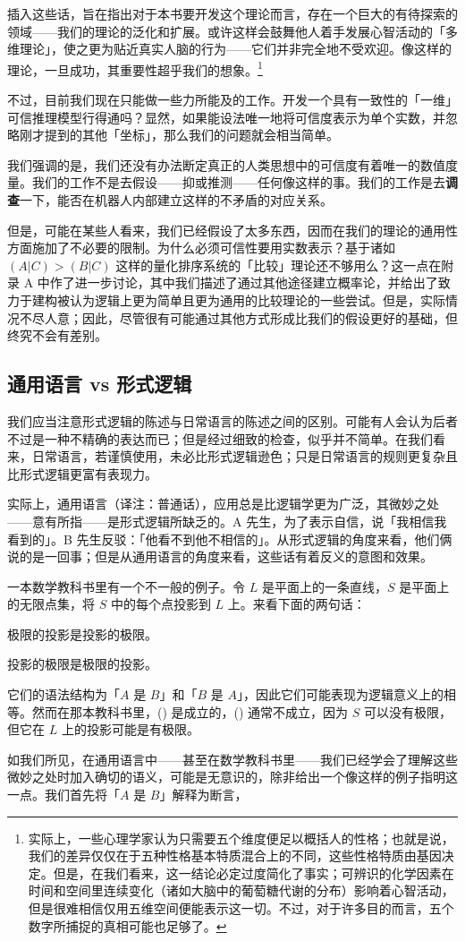 插入这些话，旨在指出对于本书要开发这个理论而言，存在一个巨大的有待探索的领域——我们的理论的泛化和扩展。或许这样会鼓舞他人着手发展心智活动的「多维理论」，使之更为贴近真实人脑的行为——它们并非完全地不受欢迎。像这样的理论，一旦成功，其重要性超乎我们的想象。\footnote{实际上，一些心理学家认为只需要五个维度便足以概括人的性格；也就是说，我们的差异仅仅在于五种性格基本特质混合上的不同，这些性格特质由基因决定。但是，在我们看来，这一结论必定过度简化了事实；可辨识的化学因素在时间和空间里连续变化（诸如大脑中的葡萄糖代谢的分布）影响着心智活动，但是很难相信仅用五维空间便能表示这一切。不过，对于许多目的而言，五个数字所捕捉的真相可能也足够了。}

不过，目前我们现在只能做一些力所能及的工作。开发一个具有一致性的「一维」可信推理模型行得通吗？显然，如果能设法唯一地将可信度表示为单个实数，并忽略刚才提到的其他「坐标」，那么我们的问题就会相当简单。

我们强调的是，我们还没有办法断定真正的人类思想中的可信度有着唯一的数值度量。我们的工作不是去假设——抑或推测——任何像这样的事。我们的工作是去{\bf 调查}一下，能否在机器人内部建立这样的不矛盾的对应关系。

但是，可能在某些人看来，我们已经假设了太多东西，因而在我们的理论的通用性方面施加了不必要的限制。为什么必须可信性要用实数表示？基于诸如 $(A|C) > (B|C)$ 这样的量化排序系统的「比较」理论还不够用么？这一点在附录 A 中作了进一步讨论，其中我们描述了通过其他途径建立概率论，并给出了致力于建构被认为逻辑上更为简单且更为通用的比较理论的一些尝试。但是，实际情况不尽人意；因此，尽管很有可能通过其他方式形成比我们的假设更好的基础，但终究不会有差别。

\subsection{通用语言 vs 形式逻辑}

我们应当注意形式逻辑的陈述与日常语言的陈述之间的区别。可能有人会认为后者不过是一种不精确的表达而已；但是经过细致的检查，似乎并不简单。在我们看来，日常语言，若谨慎使用，未必比形式逻辑逊色；只是日常语言的规则更复杂且比形式逻辑更富有表现力。

实际上，通用语言（译注：普通话），应用总是比逻辑学更为广泛，其微妙之处——意有所指——是形式逻辑所缺乏的。A 先生，为了表示自信，说「我相信我看到的」。B 先生反驳：「他看不到他不相信的」。从形式逻辑的角度来看，他们俩说的是一回事；但是从通用语言的角度来看，这些话有着反义的意图和效果。

一本数学教科书里有一个不一般的例子。令 $L$ 是平面上的一条直线，$S$ 是平面上的无限点集，将 $S$ 中的每个点投影到 $L$ 上。来看下面的两句话：

\startitemize[R]
\item 极限的投影是投影的极限。
\item 投影的极限是极限的投影。
\stopitemize

它们的语法结构为「$A$ 是 $B$」和「$B$ 是 $A$」，因此它们可能表现为逻辑意义上的相等。然而在那本教科书里，() 是成立的，() 通常不成立，因为 $S$ 可以没有极限，但它在 $L$ 上的投影可能是有极限。

如我们所见，在通用语言中——甚至在数学教科书里——我们已经学会了理解这些微妙之处时加入确切的语义，可能是无意识的，除非给出一个像这样的例子指明这一点。我们首先将「$A$ 是 $B$」解释为断言，

